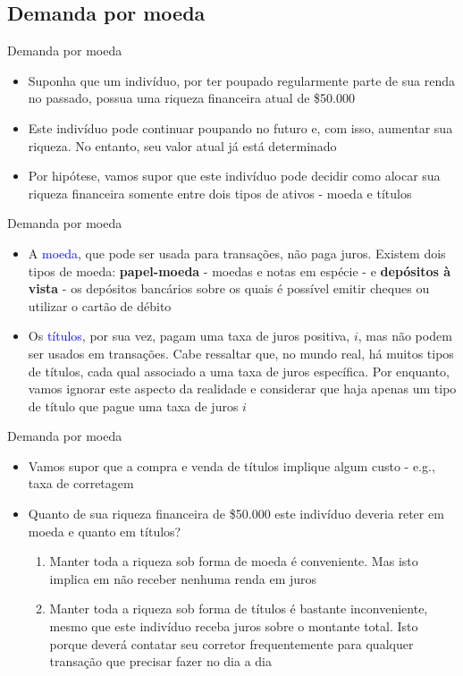 \documentclass[10pt]{beamer}
\begin{document}
\subsection{Demanda por moeda}
\begin{frame}{Demanda por moeda}
    \begin{itemize}
        \item Suponha que um indivíduo, por ter poupado regularmente parte de sua renda no passado, possua uma riqueza financeira atual de \$50.000
        \bigskip
        \item Este indivíduo pode continuar poupando no futuro e, com isso, aumentar sua riqueza. No entanto, seu valor atual já está determinado
        \bigskip
        \item Por hipótese, vamos supor que este indivíduo pode decidir como alocar sua riqueza financeira somente entre dois tipos de ativos - moeda e títulos
    \end{itemize}
\end{frame}

\begin{frame}{Demanda por moeda}
    \begin{itemize}
        \item A \textcolor{blue}{moeda}, que pode ser usada para transações, não paga juros. Existem dois tipos de moeda: \textbf{papel-moeda} - moedas e notas em espécie - e \textbf{depósitos à vista} - os depósitos bancários sobre os quais é possível emitir cheques ou utilizar o cartão de débito
        \bigskip
        \item Os \textcolor{blue}{títulos}, por sua vez, pagam uma taxa de juros positiva, $i$, mas não podem ser usados em transações. Cabe ressaltar que, no mundo real, há muitos tipos de títulos, cada qual associado a uma taxa de juros específica. Por enquanto, vamos ignorar este aspecto da realidade e considerar que haja apenas um tipo de título que pague uma taxa de juros $i$
    \end{itemize}
\end{frame}

\begin{frame}{Demanda por moeda}
    \begin{itemize}
        \item Vamos supor que a compra e venda de títulos implique algum custo - e.g., taxa de corretagem
        \bigskip
        \item Quanto de sua riqueza financeira de \$50.000 este indivíduo deveria reter em moeda e quanto em títulos?
        \bigskip
        \begin{enumerate}
            \item Manter toda a riqueza sob forma de moeda é conveniente. Mas isto implica em não receber nenhuma renda em juros
            \bigskip
            \item Manter toda a riqueza sob forma de títulos é bastante inconveniente, mesmo que este indivíduo receba juros sobre o montante total. Isto porque deverá contatar seu corretor frequentemente para qualquer transação que precisar fazer no dia a dia
        \end{enumerate}
    \end{itemize}
\end{frame}
\end{document}
